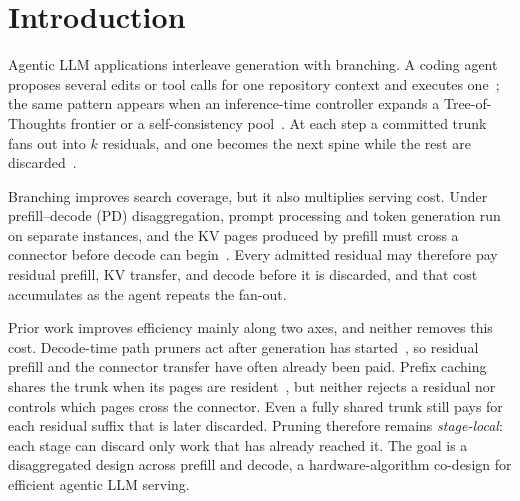 \section{Introduction}
\label{sec:intro}

Agentic LLM applications interleave generation with branching.
A coding agent proposes several edits or tool calls for one repository context and executes one~\cite{react,sweagent,openhands}; the same pattern appears when an inference-time controller expands a Tree-of-Thoughts frontier or a self-consistency pool~\cite{tot,selfconsistency,cot}.
At each step a committed trunk fans out into $k$ residuals, and one becomes the next spine while the rest are discarded~\cite{gsm8k,math,esc}.

Branching improves search coverage, but it also multiplies serving cost.
Under prefill--decode (PD) disaggregation, prompt processing and token generation run on separate instances, and the KV pages produced by prefill must cross a connector before decode can begin~\cite{distserve,splitwise}.
Every admitted residual may therefore pay residual prefill, KV transfer, and decode before it is discarded, and that cost accumulates as the agent repeats the fan-out.

Prior work improves efficiency mainly along two axes, and neither removes this cost.
Decode-time path pruners act after generation has started~\cite{esc,specrej,dpts,stoploss}, so residual prefill and the connector transfer have often already been paid.
Prefix caching shares the trunk when its pages are resident~\cite{vllm,sglang}, but neither rejects a residual nor controls which pages cross the connector.
Even a fully shared trunk still pays for each residual suffix that is later discarded.
Pruning therefore remains \emph{stage-local}: each stage can discard only work that has already reached it.
The goal is a disaggregated design across prefill and decode, a hardware-algorithm co-design for efficient agentic LLM serving.

